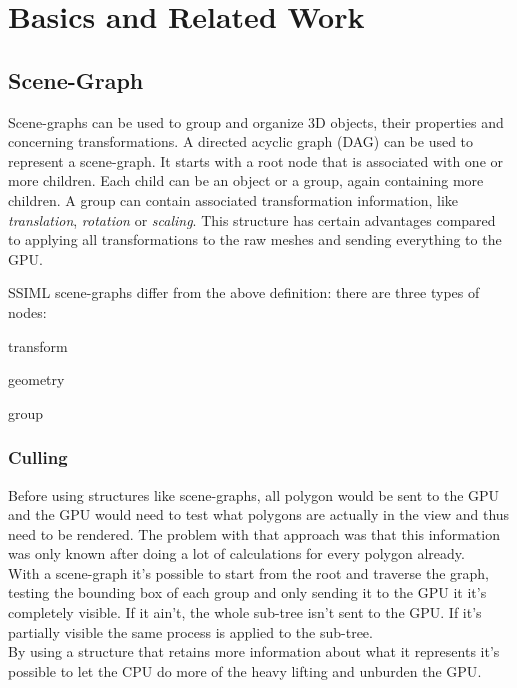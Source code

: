 
\section{Basics and Related Work}
\label{basics-and-related-work}

\subsection{Scene-Graph}\label{scene-graph}

Scene-graphs can be used to group and organize 3D objects, their
properties and concerning transformations. A directed acyclic graph
(DAG) can be used to represent a scene-graph. It starts with a root node
that is associated with one or more children. Each child can be an
object or a group, again containing more children. A group can contain
associated transformation information, like \emph{translation},
\emph{rotation} or \emph{scaling}. This structure has certain advantages
compared to applying all transformations to the raw meshes and sending
everything to the \gls{GPU}. \cite{realityprime}

\gls{SSIML} \cite{Lenk:2012:MID:2338714.2338742} scene-graphs differ from the above definition:
there are three types of nodes:
\begin{itemize*}
  \item transform
  \item geometry
  \item group
\end{itemize*}

\subsubsection{Culling}\label{culling}

Before using structures like scene-graphs, all polygon would be sent to
the \gls{GPU} and the \gls{GPU} would need to test what polygons are actually in the
view and thus need to be rendered. The problem with that approach was
that this information was only known after doing a lot of calculations
for every polygon already.\\
With a scene-graph it's possible to start from the root and traverse the
graph, testing the bounding box of each group and only sending it to the
\gls{GPU} it it's completely visible. If it ain't, the whole sub-tree isn't
sent to the \gls{GPU}. If it's partially visible the same process is applied
to the sub-tree.\\
By using a structure that retains more information about what it
represents it's possible to let the CPU do more of the heavy
lifting and unburden the \gls{GPU}.

